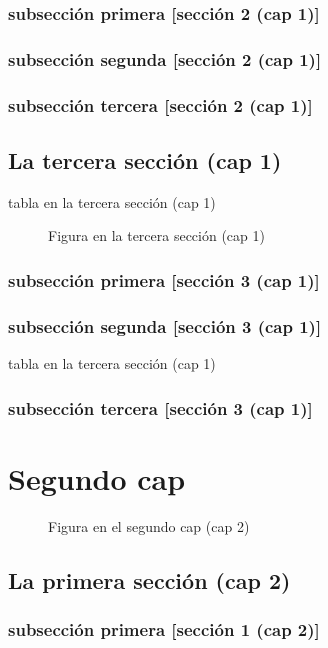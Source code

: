 \documentclass[12pt,a4paper]{report}
\begin{document}
\subsection*{subsección primera [sección 2 (cap 1)]}
\subsection*{subsección segunda [sección 2 (cap 1)]}
\subsection*{subsección tercera [sección 2 (cap 1)]}
\section{La tercera sección (cap 1)}
\begin{table}[H]
\caption{tabla en la tercera sección (cap 1)}
\end{table}
\begin{figure}[H]
\caption{Figura en la tercera sección (cap 1)}
\end{figure}
\subsection{subsección primera [sección 3 (cap 1)]}
\subsection{subsección segunda [sección 3 (cap 1)]}
\begin{table}[H]
\caption{tabla en la tercera sección (cap 1)}
\end{table}
\subsection{subsección tercera [sección 3 (cap 1)]}

\chapter*{Segundo cap}
\begin{figure}[H]
\caption{Figura en el segundo cap (cap 2)}
\end{figure}
\section*{La primera sección (cap 2)}
\subsection*{subsección primera [sección 1 (cap 2)]}
\end{document}
